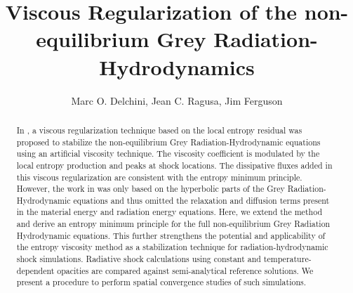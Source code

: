 \documentclass[times,doublespace]{fldauth}%
\begin{document}
%


\title{Viscous Regularization of the non-equilibrium Grey Radiation-Hydrodynamics}

\author{Marc O. Delchini, Jean C. Ragusa\corrauth{}, Jim Ferguson}

\address{
{Department of Nuclear Engineering, Texas A\&M University, College Station, TX 77843, USA} \\
{Los Alamos National Laboratory, Los Alamos, NM 87545, USA}
}


\begin{abstract}
In \cite{our_jcp_radhy_paper}, a viscous regularization technique based on the local entropy residual was
proposed to stabilize the non-equilibrium Grey Radiation-Hydrodynamic equations using an artificial viscosity technique. 
The viscosity coefficient is modulated by the local entropy production and peaks at shock locations. 
The dissipative fluxes added in this viscous regularization are consistent with the entropy minimum principle. 
However, the work in \cite{our_jcp_radhy_paper} was only based on the hyperbolic parts
of the Grey Radiation-Hydrodynamic equations and thus omitted the relaxation and diffusion terms 
present in the material energy and radiation energy equations. 
%
Here, we extend the method and derive an entropy minimum principle for the full non-equilibrium Grey Radiation Hydrodynamic 
equations. This further strengthens the potential and applicability of the entropy viscosity method as a stabilization technique 
for radiation-hydrodynamic shock simulations.
Radiative shock calculations using constant and temperature-dependent opacities are 
compared against semi-analytical reference solutions. %
We present a procedure to perform spatial convergence studies of such simulations. %
\end{abstract}
\end{document}
